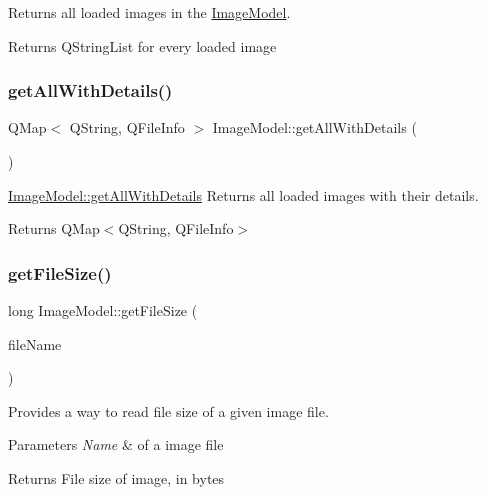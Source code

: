 Returns all loaded images in the \hyperlink{classImageModel}{Image\+Model}. 

\begin{DoxyReturn}{Returns}
Q\+String\+List for every loaded image 
\end{DoxyReturn}
\mbox{\label{classImageModel_a8256d5e2baa8833788bb63043e936137}} 
\subsubsection{\texorpdfstring{get\+All\+With\+Details()}{getAllWithDetails()}}
{\footnotesize\ttfamily Q\+Map$<$ Q\+String, Q\+File\+Info $>$ Image\+Model\+::get\+All\+With\+Details (\begin{DoxyParamCaption}{ }\end{DoxyParamCaption})}



\hyperlink{classImageModel_a8256d5e2baa8833788bb63043e936137}{Image\+Model\+::get\+All\+With\+Details} Returns all loaded images with their details. 

\begin{DoxyReturn}{Returns}
Q\+Map$<$\+Q\+String, Q\+File\+Info$>$ 
\end{DoxyReturn}
\mbox{\label{classImageModel_a38c8d5868b7a8f8acca235c4383c5102}} 
\subsubsection{\texorpdfstring{get\+File\+Size()}{getFileSize()}}
{\footnotesize\ttfamily long Image\+Model\+::get\+File\+Size (\begin{DoxyParamCaption}\item[{const Q\+String \&}]{file\+Name }\end{DoxyParamCaption})}



Provides a way to read file size of a given image file. 


\begin{DoxyParams}{Parameters}
{\em Name} & of a image file\\
\hline
\end{DoxyParams}
\begin{DoxyReturn}{Returns}
File size of image, in bytes 
\end{DoxyReturn}
\mbox{\label{classImageModel_ac0021794e5694bd76c76349b8af96428}} 
